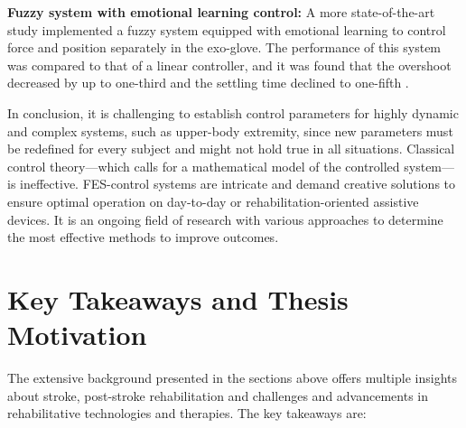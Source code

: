 \textbf{Fuzzy system with emotional learning control:} A more state-of-the-art study implemented a fuzzy system equipped with emotional learning to control force and position separately in the exo-glove. The performance of this system was compared to that of a linear controller, and it was found that the overshoot decreased by up to one-third and the settling time declined to one-fifth \cite{FZC}.


In conclusion, it is challenging to establish control parameters for highly dynamic and complex systems, such as upper-body extremity, since new parameters must be redefined for every subject and might not hold true in all situations. Classical control theory—which calls for a mathematical model of the controlled system—is ineffective. FES-control systems are intricate and demand creative solutions to ensure optimal operation on day-to-day or rehabilitation-oriented assistive devices.  It is an ongoing field of research with various approaches to determine the most effective methods to improve outcomes.

\section{Key Takeaways and Thesis Motivation}

The extensive background presented in the sections above offers multiple insights about stroke, post-stroke rehabilitation and challenges and advancements in rehabilitative technologies and therapies. The key takeaways are:

